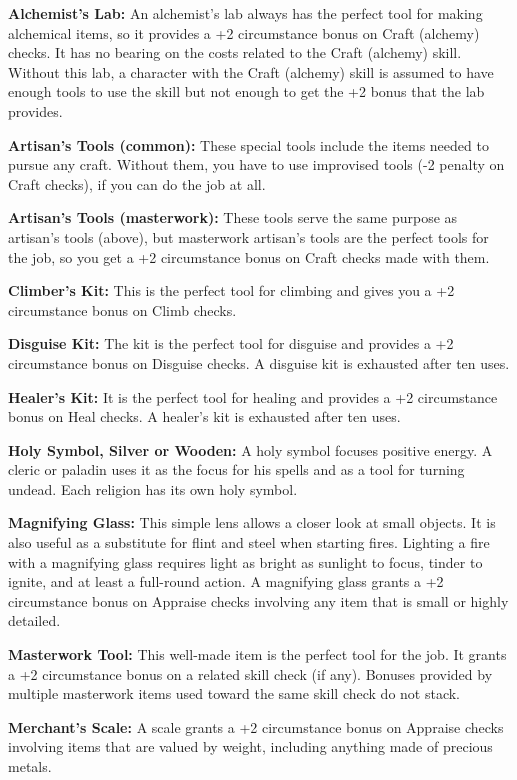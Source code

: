 \indent\textbf{Alchemist's Lab:} An alchemist's lab always has the perfect tool for making 
alchemical items, so it provides a +2 circumstance bonus on Craft (alchemy) checks. 
It has no bearing on the costs related to the Craft (alchemy) skill. Without this 
lab, a character with the Craft (alchemy) skill is assumed to have enough tools 
to use the skill but not enough to get the +2 bonus that the lab provides.

\textbf{Artisan's Tools (common):} These special tools include the items needed to pursue 
any craft. Without them, you have to use improvised tools (-2 penalty on Craft 
checks), if you can do the job at all.

\textbf{Artisan's Tools (masterwork):} These tools serve the same purpose as artisan's 
tools (above), but masterwork artisan's tools are the perfect tools for the job, 
so you get a +2 circumstance bonus on Craft checks made with them.

\textbf{Climber's Kit:} This is the perfect tool for climbing and gives you a +2 
circumstance bonus on Climb checks.

\textbf{Disguise Kit:} The kit is the perfect tool for disguise and provides a 
+2 circumstance bonus on Disguise checks. A disguise kit is exhausted after ten 
uses.

\textbf{Healer's Kit:} It is the perfect tool for healing and provides a +2 circumstance 
bonus on Heal checks. A healer's kit is exhausted after ten uses.

\textbf{Holy Symbol, Silver or Wooden:} A holy symbol focuses positive energy. 
A cleric or paladin uses it as the focus for his spells and as a tool for turning 
undead. Each religion has its own holy symbol.

\textbf{Magnifying Glass:} This simple lens allows a closer look at small objects. 
It is also useful as a substitute for flint and steel when starting fires. Lighting 
a fire with a magnifying glass requires light as bright as sunlight to focus, tinder 
to ignite, and at least a full-round action. A magnifying glass grants a +2 circumstance 
bonus on Appraise checks involving any item that is small or highly detailed.

\textbf{Masterwork Tool:} This well-made item is the perfect tool for the job. 
It grants a +2 circumstance bonus on a related skill check (if any). Bonuses provided 
by multiple masterwork items used toward the same skill check do not stack.

\textbf{Merchant's Scale:} A scale grants a +2 circumstance bonus on Appraise 
checks involving items that are valued by weight, including anything made of precious 
metals.

